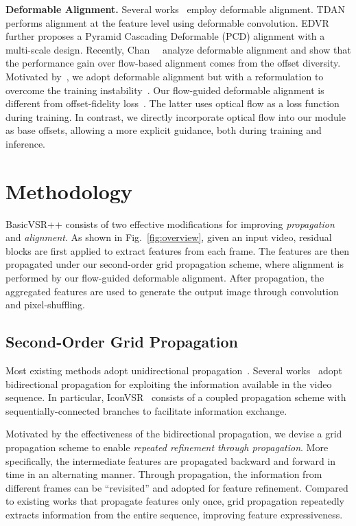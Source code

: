 \documentclass[10pt,twocolumn,letterpaper]{article}
\begin{document}
\noindent\textbf{Deformable Alignment.} Several works~\cite{tian2020tdan,wang2019deformable,wang2019edvr,xu2020learning} employ deformable alignment. TDAN~\cite{tian2020tdan} performs alignment at the feature level using deformable convolution. EDVR~\cite{wang2019edvr} further proposes a Pyramid Cascading Deformable (PCD) alignment with a multi-scale design. Recently, Chan~\etal~\cite{chan2021understanding} analyze deformable alignment and show that the performance gain over flow-based alignment comes from the offset diversity.
Motivated by~\cite{chan2021understanding}, we adopt deformable alignment but with a reformulation to overcome the training instability~\cite{chan2021understanding}.
Our flow-guided deformable alignment is different from offset-fidelity loss~\cite{chan2021understanding}. The latter uses optical flow as a loss function during training. In contrast, we directly incorporate optical flow into our module as base offsets, allowing a more explicit guidance, both during training and inference.
 \section{Methodology}

BasicVSR++ consists of two effective modifications for improving \textit{propagation} and \textit{alignment}. As shown in Fig.~\ref{fig:overview}, given an input video, residual blocks are first applied to extract features from each frame. The features are then propagated under our second-order grid propagation scheme, where alignment is performed by our flow-guided deformable alignment. After propagation, the aggregated features are used to generate the output image through convolution and pixel-shuffling.

\subsection{Second-Order Grid Propagation}
\label{sec:propagation}
Most existing methods adopt unidirectional propagation~\cite{isobe2020video1,isobe2020revisiting,sajjadi2018frame}. Several works~\cite{chan2021basicvsr,huang2015bidirectional,huang2018video} adopt bidirectional propagation for exploiting the information available in the video sequence.
In particular, IconVSR~\cite{chan2021basicvsr} consists of a coupled propagation scheme with sequentially-connected branches to facilitate information exchange.

Motivated by the effectiveness of the bidirectional propagation, we devise a grid propagation scheme to enable \textit{repeated refinement through propagation}. More specifically, the intermediate features are propagated backward and forward in time in an alternating manner. Through propagation, the information from different frames can be ``revisited'' and adopted for feature refinement. Compared to existing works that propagate features only once, grid propagation repeatedly extracts information from the entire sequence, improving feature expressiveness.
\end{document}
